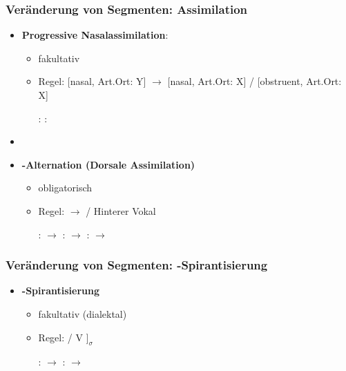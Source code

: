 \begin{frame}
\frametitle{Veränderung von Segmenten: Assimilation}

\begin{itemize}
	\item \textbf{Progressive Nasalassimilation}:

	\begin{itemize}
		\item fakultativ
		\item Regel: [nasal, Art.Ort: Y] $\rightarrow$ [nasal, Art.Ort: X] /  [obstruent, Art.Ort: X] \underline{\quad} 

	\eal
		\ex {}:  \ras 
		\textipa{[ha:k\textsyllabic{n}]} \ras \textipa{[ha:k\textsyllabic{N}]}
		\ex {}:  \ras 
		\textipa{[SU\.p\textsyllabic{n}]} \ras \textipa{[SU\.p\textsyllabic{m}]}
	\zl
	
	\end{itemize}

	\item[]
	\item \textbf{\textipa{[\c{c}]/[x]}-Alternation (Dorsale Assimilation)}

	\begin{itemize}
		\item obligatorisch
		\item Regel:  $\rightarrow$ \textipa{[x]} / Hinterer Vokal \underline{\quad}

	\eal
		\ex {}:  $\rightarrow$ \textipa{[mI\c{c}]}
		\ex {}:  $\rightarrow$ \textipa{[bu:x]}
		\ex {}:  $\rightarrow$ \textipa{[PEl\c{c}]}
	\zl
	
	\end{itemize}		

\end{itemize}

\end{frame}


\begin{frame}
\frametitle{Veränderung von Segmenten: -Spirantisierung}

\begin{itemize}
	\item \textbf{-Spirantisierung}

	\begin{itemize}
		\item fakultativ (dialektal)
		\item Regel:  \ras {} / V\underline{\quad} $]_\sigma$

\eal	
	\ex {}:  $\rightarrow$ \textipa{[za:xst]}
	\ex {}:  $\rightarrow$ \textipa{[f{\textscr}\t{ɔɪ}.dI\c{c}]}
\zl

	\end{itemize}
\end{itemize}

\end{frame}


